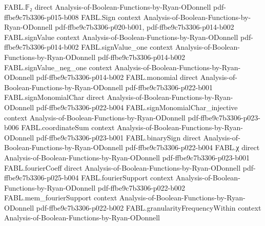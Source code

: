 \begin{theorem}
\leanok
{}
\proofstep
  {FABL.𝔽₂}
  {direct}
  {Analysis-of-Boolean-Functions-by-Ryan-ODonnell}
  {pdf-ffbe9c7b3306-p015-b008}
\proofstep
  {FABL.Sign}
  {context}
  {Analysis-of-Boolean-Functions-by-Ryan-ODonnell}
  {pdf-ffbe9c7b3306-p020-b001,
    pdf-ffbe9c7b3306-p014-b002}
\proofstep
  {FABL.signValue}
  {context}
  {Analysis-of-Boolean-Functions-by-Ryan-ODonnell}
  {pdf-ffbe9c7b3306-p014-b002}
\proofstep
  {FABL.signValue_one}
  {context}
  {Analysis-of-Boolean-Functions-by-Ryan-ODonnell}
  {pdf-ffbe9c7b3306-p014-b002}
\proofstep
  {FABL.signValue_neg_one}
  {context}
  {Analysis-of-Boolean-Functions-by-Ryan-ODonnell}
  {pdf-ffbe9c7b3306-p014-b002}
\proofstep
  {FABL.monomial}
  {direct}
  {Analysis-of-Boolean-Functions-by-Ryan-ODonnell}
  {pdf-ffbe9c7b3306-p022-b001}
\proofstep
  {FABL.signMonomialChar}
  {direct}
  {Analysis-of-Boolean-Functions-by-Ryan-ODonnell}
  {pdf-ffbe9c7b3306-p022-b004}
\proofstep
  {FABL.signMonomialChar_injective}
  {context}
  {Analysis-of-Boolean-Functions-by-Ryan-ODonnell}
  {pdf-ffbe9c7b3306-p023-b006}
\proofstep
  {FABL.coordinateSum}
  {context}
  {Analysis-of-Boolean-Functions-by-Ryan-ODonnell}
  {pdf-ffbe9c7b3306-p023-b001}
\proofstep
  {FABL.binarySign}
  {direct}
  {Analysis-of-Boolean-Functions-by-Ryan-ODonnell}
  {pdf-ffbe9c7b3306-p022-b004}
\proofstep
  {FABL.χ}
  {direct}
  {Analysis-of-Boolean-Functions-by-Ryan-ODonnell}
  {pdf-ffbe9c7b3306-p023-b001}
\proofstep
  {FABL.fourierCoeff}
  {direct}
  {Analysis-of-Boolean-Functions-by-Ryan-ODonnell}
  {pdf-ffbe9c7b3306-p025-b004}
\proofstep
  {FABL.fourierSupport}
  {context}
  {Analysis-of-Boolean-Functions-by-Ryan-ODonnell}
  {pdf-ffbe9c7b3306-p022-b002}
\proofstep
  {FABL.mem_fourierSupport}
  {context}
  {Analysis-of-Boolean-Functions-by-Ryan-ODonnell}
  {pdf-ffbe9c7b3306-p022-b002}
\proofstep
  {FABL.granularityFrequencyWithin}
  {context}
  {Analysis-of-Boolean-Functions-by-Ryan-ODonnell}

\end{theorem}
